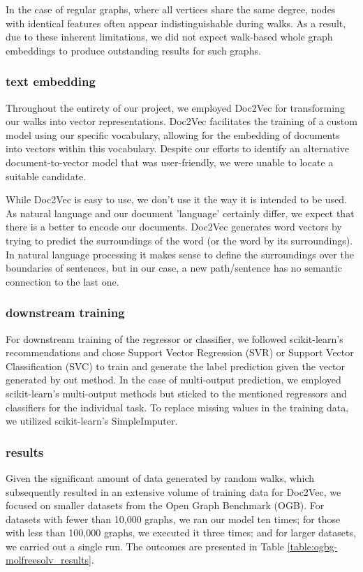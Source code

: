 In the case of regular graphs, where all vertices share the same degree, nodes with identical features often appear indistinguishable during walks. As a result, due to these inherent limitations, we did not expect walk-based whole graph embeddings to produce outstanding results for such graphs.

\subsubsection{text embedding}
Throughout the entirety of our project, we employed Doc2Vec\cite{2014doc2vec} for transforming our walks into vector representations. Doc2Vec facilitates the training of a custom model using our specific vocabulary, allowing for the embedding of documents into vectors within this vocabulary. Despite our efforts to identify an alternative document-to-vector model that was user-friendly, we were unable to locate a suitable candidate.

While Doc2Vec is easy to use, we don't use it the way it is intended to be used. As natural language and our document 'language' certainly differ, we expect that there is a better to encode our documents. Doc2Vec generates word vectors by trying to predict the surroundings of the word (or the word by its surroundings). In natural language processing it makes sense to define the surroundings over the boundaries of sentences, but in our case, a new path/sentence has no semantic connection to the last one.


\subsubsection{downstream training}
For downstream training of the regressor or classifier, we followed scikit-learn's recommendations and chose Support Vector Regression (SVR) or Support Vector Classification (SVC) to train and generate the label prediction given the vector generated by out method. In the case of multi-output prediction, we employed scikit-learn's multi-output methods but sticked to the mentioned regressors and classifiers for the individual task. To replace missing values in the training data, we utilized scikit-learn's SimpleImputer.

\subsubsection{results}
Given the significant amount of data generated by random walks, which subsequently resulted in an extensive volume of training data for Doc2Vec, we focused on smaller datasets from the Open Graph Benchmark (OGB). For datasets with fewer than 10,000 graphs, we ran our model ten times; for those with less than 100,000 graphs, we executed it three times; and for larger datasets, we carried out a single run. The outcomes are presented in Table \ref{table:ogbg-molfreesolv_results}.

